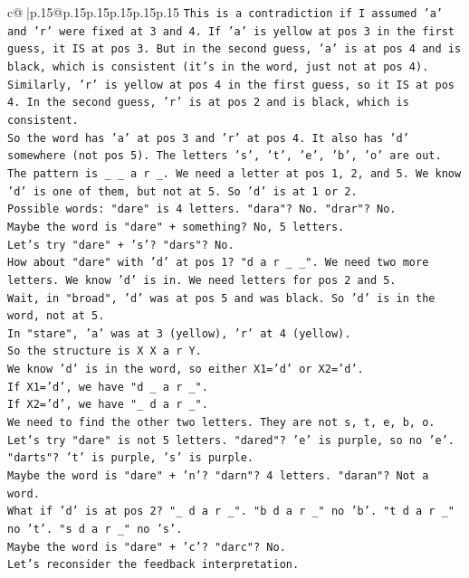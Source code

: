 \documentclass{article}
\begin{document}
{\begin{supertabular}{c@{$\;$}|p{.15\linewidth}@{}p{.15\linewidth}p{.15\linewidth}p{.15\linewidth}p{.15\linewidth}p{.15\linewidth}}
{{{\texttt{This is a contradiction if I assumed 'a' and 'r' were fixed at 3 and 4. If 'a' is yellow at pos 3 in the first guess, it IS at pos 3. But in the second guess, 'a' is at pos 4 and is black, which is consistent (it's in the word, just not at pos 4). Similarly, 'r' is yellow at pos 4 in the first guess, so it IS at pos 4. In the second guess, 'r' is at pos 2 and is black, which is consistent.} \\
\texttt{So the word has 'a' at pos 3 and 'r' at pos 4. It also has 'd' somewhere (not pos 5). The letters 's', 't', 'e', 'b', 'o' are out.} \\
\texttt{The pattern is \_ \_ a r \_. We need a letter at pos 1, 2, and 5. We know 'd' is one of them, but not at 5. So 'd' is at 1 or 2.} \\
\texttt{Possible words: "dare" is 4 letters. "dara"? No. "drar"? No.} \\
\texttt{Maybe the word is "dare" + something? No, 5 letters.} \\
\texttt{Let's try "dare" + 's'? "dars"? No.} \\
\texttt{How about "dare" with 'd' at pos 1? "d a r \_ \_". We need two more letters. We know 'd' is in. We need letters for pos 2 and 5.} \\
\texttt{Wait, in "broad", 'd' was at pos 5 and was black. So 'd' is in the word, not at 5.} \\
\texttt{In "stare", 'a' was at 3 (yellow), 'r' at 4 (yellow).} \\
\texttt{So the structure is X X a r Y.} \\
\texttt{We know 'd' is in the word, so either X1='d' or X2='d'.} \\
\texttt{If X1='d', we have "d \_ a r \_".} \\
\texttt{If X2='d', we have "\_ d a r \_".} \\
\texttt{We need to find the other two letters. They are not s, t, e, b, o.} \\
\texttt{Let's try "dare" is not 5 letters. "dared"? 'e' is purple, so no 'e'. "darts"? 't' is purple, 's' is purple.} \\
\texttt{Maybe the word is "dare" + 'n'? "darn"? 4 letters. "daran"? Not a word.} \\
\texttt{What if 'd' is at pos 2? "\_ d a r \_". "b d a r \_" no 'b'. "t d a r \_" no 't'. "s d a r \_" no 's'.} \\
\texttt{Maybe the word is "dare" + 'c'? "darc"? No.} \\
\texttt{Let's reconsider the feedback interpretation.} \\
}}}
\end{supertabular}}
\end{document}
